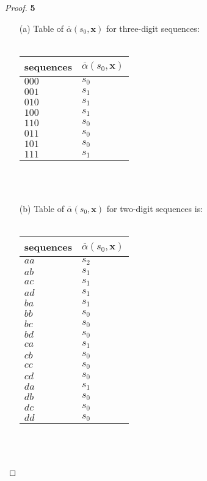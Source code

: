 \documentclass[11pt]{article}
\begin{document}
		\begin{proof}{\textbf{5}}
			\begin{itemize}
				\item[(a)] Table of $\overline{\alpha}(s_0,\bm{x})$ for three-digit sequences:\\\\
			\begin{adjustbox}{max width=\textwidth,center}
			\begin{tabular}{l|l}
				sequences & $\overline{\alpha}(s_0,\bm{x})$ \\ \hline
				$000$     & $s_0$ \\
				$001$     & $s_1$ \\
				$010$     & $s_1$ \\
				$100$     & $s_1$ \\
				$110$     & $s_0$ \\
				$011$     & $s_0$ \\
				$101$     & $s_0$ \\
				$111$     & $s_1$ \\ 
			\end{tabular}
			\end{adjustbox}\\\\
\cleardoublepage
				\item[(b)] Table of $\overline{\alpha}(s_0,\bm{x})$ for two-digit sequences is:\\\\
			\begin{adjustbox}{max width=\textwidth,center}
			\begin{tabular}{l|l}
				sequences & $\overline{\alpha}(s_0,\bm{x})$ \\ \hline
				$aa$     & $s_2$ \\
				$ab$     & $s_1$ \\
				$ac$     & $s_1$ \\
				$ad$     & $s_1$ \\
				$ba$     & $s_1$ \\
				$bb$     & $s_0$ \\
				$bc$     & $s_0$ \\
				$bd$     & $s_0$ \\ 
				$ca$     & $s_1$ \\
				$cb$     & $s_0$ \\ 
				$cc$     & $s_0$ \\
				$cd$     & $s_0$ \\ 
				$da$     & $s_1$ \\
				$db$     & $s_0$ \\ 
				$dc$     & $s_0$ \\ 
				$dd$     & $s_0$ \\ 
			\end{tabular}
			\end{adjustbox}\\\\
			\end{itemize}
		\end{proof}
\end{document}
